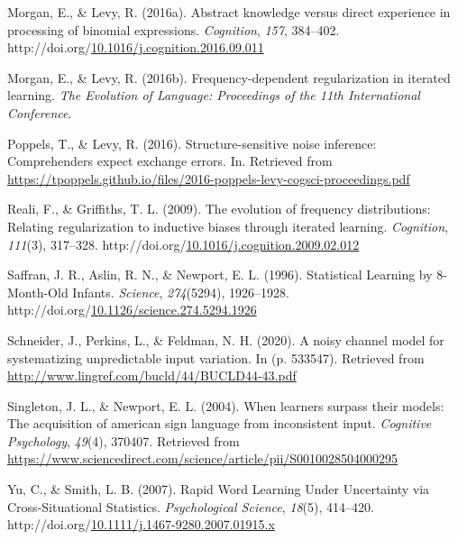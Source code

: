 \documentclass[10pt, letterpaper]{article}
\newenvironment{CSLReferences}%
  {}%
  {\par}
\begin{document}
\begin{CSLReferences}{1}{0}
\leavevmode{}%
Morgan, E., \& Levy, R. (2016a). Abstract knowledge versus direct
experience in processing of binomial expressions. \emph{Cognition},
\emph{157}, 384--402.
http://doi.org/\href{https://doi.org/10.1016/j.cognition.2016.09.011}{10.1016/j.cognition.2016.09.011}

\leavevmode{}%
Morgan, E., \& Levy, R. (2016b). Frequency-dependent regularization in
iterated learning. \emph{The Evolution of Language: Proceedings of the
11th International Conference}.

\leavevmode{}%
Poppels, T., \& Levy, R. (2016). Structure-sensitive noise inference:
Comprehenders expect exchange errors. In. Retrieved from
\url{https://tpoppels.github.io/files/2016-poppels-levy-cogsci-proceedings.pdf}

\leavevmode{}%
Reali, F., \& Griffiths, T. L. (2009). The evolution of frequency
distributions: Relating regularization to inductive biases through
iterated learning. \emph{Cognition}, \emph{111}(3), 317--328.
http://doi.org/\href{https://doi.org/10.1016/j.cognition.2009.02.012}{10.1016/j.cognition.2009.02.012}

\leavevmode{}%
Saffran, J. R., Aslin, R. N., \& Newport, E. L. (1996). Statistical
Learning by 8-Month-Old Infants. \emph{Science}, \emph{274}(5294),
1926--1928.
http://doi.org/\href{https://doi.org/10.1126/science.274.5294.1926}{10.1126/science.274.5294.1926}

\leavevmode{}%
Schneider, J., Perkins, L., \& Feldman, N. H. (2020). A noisy channel
model for systematizing unpredictable input variation. In (p. 533547).
Retrieved from \url{http://www.lingref.com/bucld/44/BUCLD44-43.pdf}

\leavevmode{}%
Singleton, J. L., \& Newport, E. L. (2004). When learners surpass their
models: The acquisition of american sign language from inconsistent
input. \emph{Cognitive Psychology}, \emph{49}(4), 370407. Retrieved from
\url{https://www.sciencedirect.com/science/article/pii/S0010028504000295}

\leavevmode{}%
Yu, C., \& Smith, L. B. (2007). Rapid Word Learning Under Uncertainty
via Cross-Situational Statistics. \emph{Psychological Science},
\emph{18}(5), 414--420.
http://doi.org/\href{https://doi.org/10.1111/j.1467-9280.2007.01915.x}{10.1111/j.1467-9280.2007.01915.x}

\end{CSLReferences}


\end{document}
